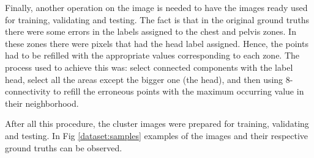 Finally, another operation on the image is needed to have the images ready used for training, validating and testing. The fact is that in the original ground truths there were some errors in the labels assigned to the chest and pelvis zones. In these zones there were pixels that had the head label assigned. Hence, the points had to be refilled with the appropriate values corresponding to each zone. The process used to achieve this was: select connected components with the label head, select all the areas except the bigger one (the head), and then using 8-connectivity to refill the erroneous points with the maximum occurring value in their neighborhood.\newline

After all this procedure, the cluster images were prepared for training, validating and testing. In Fig \ref{dataset:samples} examples of the images and their respective ground truths can be observed.

